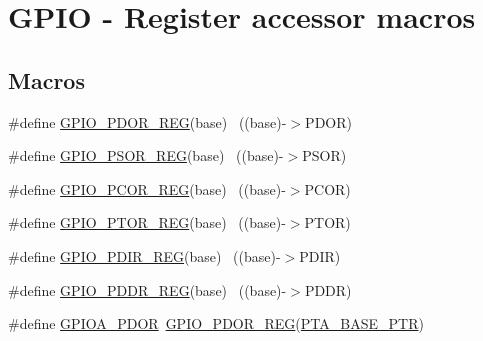 \hypertarget{group___g_p_i_o___register___accessor___macros}{}\section{G\+P\+IO -\/ Register accessor macros}
\label{group___g_p_i_o___register___accessor___macros}
\subsection*{Macros}
\begin{DoxyCompactItemize}
\item 
\#define \hyperlink{group___g_p_i_o___register___accessor___macros_ga737b4580bb16c01a468bc2c129e54d86}{G\+P\+I\+O\+\_\+\+P\+D\+O\+R\+\_\+\+R\+EG}(base)                                        ~((base)-\/$>$P\+D\+OR)
\item 
\#define \hyperlink{group___g_p_i_o___register___accessor___macros_ga05da33b22ee087558800c07d743c52e7}{G\+P\+I\+O\+\_\+\+P\+S\+O\+R\+\_\+\+R\+EG}(base)                                        ~((base)-\/$>$P\+S\+OR)
\item 
\#define \hyperlink{group___g_p_i_o___register___accessor___macros_gafeabd0beb942930229271934efc513ef}{G\+P\+I\+O\+\_\+\+P\+C\+O\+R\+\_\+\+R\+EG}(base)                                        ~((base)-\/$>$P\+C\+OR)
\item 
\#define \hyperlink{group___g_p_i_o___register___accessor___macros_ga4c1b943d4d92f73c9f08d272d8fc8fe1}{G\+P\+I\+O\+\_\+\+P\+T\+O\+R\+\_\+\+R\+EG}(base)                                        ~((base)-\/$>$P\+T\+OR)
\item 
\#define \hyperlink{group___g_p_i_o___register___accessor___macros_gac2c9f15f5083562b4f7c2826afe2d2b6}{G\+P\+I\+O\+\_\+\+P\+D\+I\+R\+\_\+\+R\+EG}(base)                                        ~((base)-\/$>$P\+D\+IR)
\item 
\#define \hyperlink{group___g_p_i_o___register___accessor___macros_ga059c8153363c15c02fbf13c0de04298d}{G\+P\+I\+O\+\_\+\+P\+D\+D\+R\+\_\+\+R\+EG}(base)                                        ~((base)-\/$>$P\+D\+DR)
\item 
\#define \hyperlink{group___g_p_i_o___register___accessor___macros_ga5c5a9a4e809579e68ae743d931312cc5}{G\+P\+I\+O\+A\+\_\+\+P\+D\+OR}~\hyperlink{group___g_p_i_o___register___accessor___macros_ga737b4580bb16c01a468bc2c129e54d86}{G\+P\+I\+O\+\_\+\+P\+D\+O\+R\+\_\+\+R\+EG}(\hyperlink{group___g_p_i_o___peripheral_gadf98f6ee2bbfd42102e378a66b29b9ef}{P\+T\+A\+\_\+\+B\+A\+S\+E\+\_\+\+P\+TR})

\end{DoxyCompactItemize}
